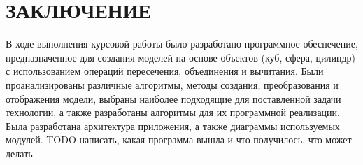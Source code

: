 \section*{ЗАКЛЮЧЕНИЕ}
В  ходе  выполнения  курсовой работы  было  разработано  программное обеспечение, предназначенное для создания моделей на основе объектов (куб, 
сфера, цилиндр) с использованием операций пересечения, объединения и 
вычитания.  
Были  проанализированы  различные  алгоритмы,  методы  создания, 
преобразования  и  отображения  модели,  выбраны  наиболее  подходящие  для поставленной  задачи  технологии,  а  также  разработаны  алгоритмы  для  их 
программной реализации. 
Была разработана архитектура приложения, а также 
диаграммы используемых модулей. 
TODO написать, какая программа вышла и что получилось, что может делать
\pagebreak